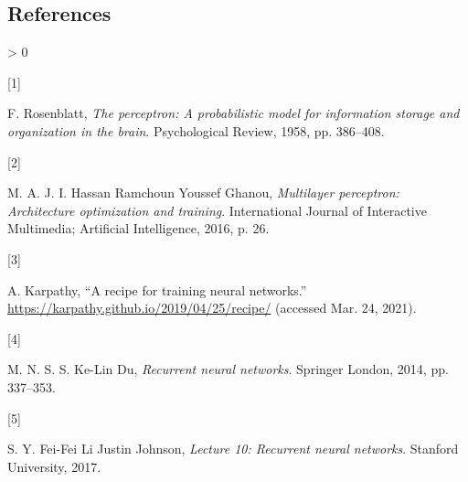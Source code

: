 \documentclass[
]{article}
\newlength{\cslhangindent}
\newlength{\csllabelwidth}
\newenvironment{CSLReferences}[2] %
 {%
  \setlength{\parindent}{0pt}
  \ifodd #1 \everypar{\setlength{\hangindent}{\cslhangindent}}\ignorespaces\fi
  \ifnum #2 > 0
  \setlength{\parskip}{#2\baselineskip}
  \fi
 }%
 {}
\newcommand{\CSLLeftMargin}[1]{\parbox[t]{\csllabelwidth}{#1}}
\newcommand{\CSLRightInline}[1]{\parbox[t]{\linewidth - \csllabelwidth}{#1}\break}
\begin{document}
\newpage

\hypertarget{references}{%
\subsection{References}\label{references}}

\hypertarget{refs}{}
\begin{CSLReferences}{0}{0}
\leavevmode\hypertarget{ref-perceptron_paper}{}%
\CSLLeftMargin{{[}1{]} }
\CSLRightInline{F. Rosenblatt, \emph{The perceptron: A probabilistic
model for information storage and organization in the brain}.
Psychological Review, 1958, pp. 386--408.}

\leavevmode\hypertarget{ref-mlp_architecture}{}%
\CSLLeftMargin{{[}2{]} }
\CSLRightInline{M. A. J. I. Hassan Ramchoun Youssef Ghanou,
\emph{Multilayer perceptron: Architecture optimization and training}.
International Journal of Interactive Multimedia; Artificial
Intelligence, 2016, p. 26.}

\leavevmode\hypertarget{ref-recipe_training}{}%
\CSLLeftMargin{{[}3{]} }
\CSLRightInline{A. Karpathy, {``A recipe for training neural
networks.''} \url{https://karpathy.github.io/2019/04/25/recipe/}
(accessed Mar. 24, 2021).}

\leavevmode\hypertarget{ref-RNN}{}%
\CSLLeftMargin{{[}4{]} }
\CSLRightInline{M. N. S. S. Ke-Lin Du, \emph{Recurrent neural networks}.
Springer London, 2014, pp. 337--353.}

\leavevmode\hypertarget{ref-RNN_Stanford}{}%
\CSLLeftMargin{{[}5{]} }
\CSLRightInline{S. Y. Fei-Fei Li Justin Johnson, \emph{Lecture 10:
Recurrent neural networks}. Stanford University, 2017.}

\end{CSLReferences}
\end{document}

